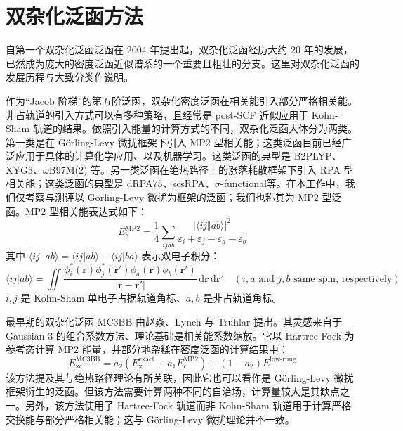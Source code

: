 \section{双杂化泛函方法}

自第一个双杂化泛函泛函在 2004 年提出起\cite{Zhao-Truhlar.JPCA.2004}，双杂化泛函经历大约 20 年的发展，已然成为庞大的密度泛函近似谱系的一个重要且粗壮的分支。这里对双杂化泛函的发展历程与大致分类作说明。

作为“Jacob 阶梯”的第五阶泛函，双杂化密度泛函在相关能引入部分严格相关能。非占轨道的引入方式可以有多种策略，且经常是 post-SCF 近似应用于 Kohn-Sham 轨道的结果。依照引入能量的计算方式的不同，双杂化泛函大体分为两类。第一类是在 G\"{o}rling-Levy 微扰框架\cite{Goerling-Levy.PRB.1993, Goerling-Levy.PRA.1994}下引入 MP2 型相关能；这类泛函目前已经广泛应用于具体的计算化学应用、以及机器学习。这类泛函的典型是 B2PLYP\cite{Grimme-Grimme.JCP.2006}、XYG3\cite{Zhang-Goddard.PNAS.2009}、$\omega$B97M(2)\cite{Mardirossian-Head-Gordon.JCP.2018} 等。另一类泛函在绝热路径上的涨落耗散框架\cite{Langreth-Perdew.SSC.1975, Langreth-Perdew.PRB.1977, Goerling-Goerling.PRB.2019}下引入 RPA 型相关能；这类泛函的典型是 dRPA75\cite{Mezei-Kallay.JCTC.2015}、scsRPA\cite{Zhang-Xu.JPCL.2019}、$\sigma$-functional\cite{Trushin-Goerling.JCP.2021}等。在本工作中，我们仅考察与测评以 G\"{o}rling-Levy 微扰为框架的泛函；我们也称其为 MP2 型泛函。MP2 型相关能表达式如下：
\begin{equation}
  E_\mathrm{c}^\mathrm{MP2} = \frac{1}{4} \sum_{ijab} \frac{\big| \langle ij \Vert ab \rangle \big|^2}{\varepsilon_i + \varepsilon_j - \varepsilon_a - \varepsilon_b}
\end{equation}
其中 $\langle ij || ab \rangle = \langle ij | ab \rangle - \langle ij | ba \rangle$ 表示双电子积分：
\begin{equation}
  \langle ij | ab \rangle = \iint \frac{\phi_i^*(\bm{r}) \phi_j^*(\bm{r}') \phi_a(\bm{r}) \phi_b(\bm{r}')}{|\bm{r} - \bm{r}'|} \, \mathrm{d} \bm{r} \, \mathrm{d} \bm{r}' \quad (i, a \text{ and } j, b \text{ same spin, respectively})
\end{equation}
$i, j$ 是 Kohn-Sham 单电子占据轨道角标、$a, b$ 是非占轨道角标。

最早期的双杂化泛函 MC3BB 由赵焱、Lynch 与 Truhlar 提出\cite{Zhao-Truhlar.JPCA.2004}。其灵感来自于 Gaussian-3\cite{Curtiss-Pople.JCP.1998, Curtiss-Pople.JCP.2000} 的组合系数方法、理论基础是相关能系数缩放\cite{Gordon-Truhlar.JACS.1986}。它以 Hartree-Fock 为参考态计算 MP2 能量，并部分地杂糅在密度泛函的计算结果中：
\begin{equation}
  E_\mathrm{xc}^\mathrm{MC3BB} = a_2 (E_\mathrm{x}^\mathrm{exact} + a_1 E_\mathrm{c}^\mathrm{MP2}) + (1 - a_2) E^\text{low-rung}
\end{equation}
该方法提及其与绝热路径理论有所关联，因此它也可以看作是 G\"{o}rling-Levy 微扰框架衍生的泛函。但该方法需要计算两种不同的自洽场，计算量较大是其缺点之一。另外，该方法使用了 Hartree-Fock 轨道而非 Kohn-Sham 轨道用于计算严格交换能与部分严格相关能；这与 G\"{o}rling-Levy 微扰理论并不一致。

